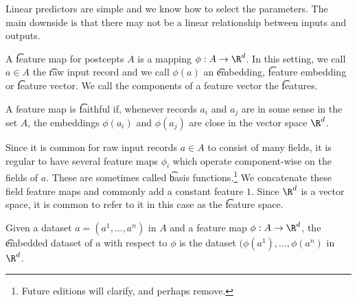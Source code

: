 

Linear predictors are simple and we know how to select the parameters.
The main downside is that there may not be a linear relationship between inputs and outputs.


A \t{feature map} for postcepts $A$ is a mapping $\phi: A \to \R^d$.
In this setting, we call $a \in A$ the \t{raw input record} and we call $\phi(a)$ an \t{embedding}, \t{feature embedding} or \t{feature vector}.
We call the components of a feature vector the \t{features}.

A feature map is \t{faithful} if, whenever records $a_i$ and $a_j$ are in some sense  in the set $A$, the embeddings $\phi(a_i)$ and $\phi(a_j)$ are close in the vector space $\R^d$.

Since it is common for raw input records $a \in A$ to consist of many fields, it is regular to have several feature maps $\phi_i$ which operate component-wise on the fields of $a$.
These are sometimes called \t{basis functions}.\footnote{Future editions will clarify, and perhaps remove.}
We concatenate these field feature maps and commonly add a constant feature $1$.
Since $\R^d$ is a vector space, it is common to refer to it in this case as the \t{feature space}.

Given a dataset $a = (a^1, \dots, a^n)$ in $A$ and a feature map $\phi: A \to \R^d$, the \t{embedded dataset} of $a$ with respect to $\phi$ is the dataset $(\phi(a^1), \dots, \phi(a^n)$ in $\R^d$.

\blankpage
